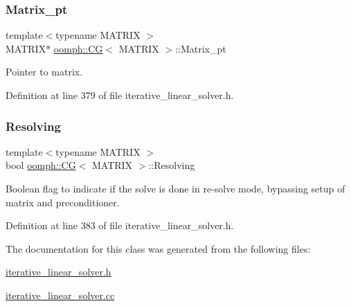 \subsubsection{\texorpdfstring{Matrix\+\_\+pt}{Matrix\_pt}}
{\footnotesize\ttfamily template$<$typename M\+A\+T\+R\+IX $>$ \\
M\+A\+T\+R\+IX$\ast$ \hyperlink{classoomph_1_1CG}{oomph\+::\+CG}$<$ M\+A\+T\+R\+IX $>$\+::Matrix\+\_\+pt\hspace{0.3cm}{\ttfamily [private]}}



Pointer to matrix. 



Definition at line 379 of file iterative\+\_\+linear\+\_\+solver.\+h.

\mbox{\label{classoomph_1_1CG_abb0446c6424e75adff3b220acb61159e}} 
\subsubsection{\texorpdfstring{Resolving}{Resolving}}
{\footnotesize\ttfamily template$<$typename M\+A\+T\+R\+IX $>$ \\
bool \hyperlink{classoomph_1_1CG}{oomph\+::\+CG}$<$ M\+A\+T\+R\+IX $>$\+::Resolving\hspace{0.3cm}{\ttfamily [private]}}



Boolean flag to indicate if the solve is done in re-\/solve mode, bypassing setup of matrix and preconditioner. 



Definition at line 383 of file iterative\+\_\+linear\+\_\+solver.\+h.



The documentation for this class was generated from the following files\+:\begin{DoxyCompactItemize}
\item 
\hyperlink{iterative__linear__solver_8h}{iterative\+\_\+linear\+\_\+solver.\+h}\item 
\hyperlink{iterative__linear__solver_8cc}{iterative\+\_\+linear\+\_\+solver.\+cc}\end{DoxyCompactItemize}
